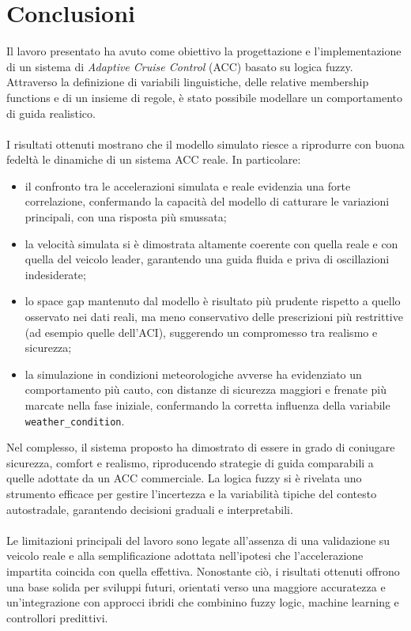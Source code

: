 \chapter{Conclusioni}
\label{cha:conclusioni}

\noindent Il lavoro presentato ha avuto come obiettivo la progettazione e l'implementazione 
di un sistema di \textit{Adaptive Cruise Control} (ACC) basato su logica fuzzy.  
Attraverso la definizione di variabili linguistiche, delle relative membership functions 
e di un insieme di regole, è stato possibile modellare un comportamento 
di guida realistico.
\\\\
\noindent I risultati ottenuti mostrano che il modello simulato riesce a riprodurre con buona 
fedeltà le dinamiche di un sistema ACC reale.  
In particolare:
\begin{itemize}
    \item il confronto tra le accelerazioni simulata e reale evidenzia una forte correlazione, 
    confermando la capacità del modello di catturare le variazioni principali, con una risposta più smussata;
    \item la velocità simulata si è dimostrata altamente coerente con quella reale e con quella del veicolo leader, 
    garantendo una guida fluida e priva di oscillazioni indesiderate;
    \item lo space gap mantenuto dal modello è risultato più prudente rispetto a quello osservato nei dati reali, 
    ma meno conservativo delle prescrizioni più restrittive (ad esempio quelle dell'ACI), 
    suggerendo un compromesso tra realismo e sicurezza;
    \item la simulazione in condizioni meteorologiche avverse ha evidenziato un comportamento più cauto, 
    con distanze di sicurezza maggiori e frenate più marcate nella fase iniziale, confermando 
    la corretta influenza della variabile \texttt{weather\_condition}.
\end{itemize}

\noindent Nel complesso, il sistema proposto ha dimostrato di essere in grado di coniugare sicurezza, comfort e realismo, 
riproducendo strategie di guida comparabili a quelle adottate da un ACC commerciale.  
La logica fuzzy si è rivelata uno strumento efficace per gestire l'incertezza e la variabilità tipiche del contesto autostradale, 
garantendo decisioni graduali e interpretabili.
\\\\
\noindent Le limitazioni principali del lavoro sono legate all'assenza di una validazione su veicolo reale 
e alla semplificazione adottata nell'ipotesi che l'accelerazione impartita coincida con quella effettiva.  
Nonostante ciò, i risultati ottenuti offrono una base solida per sviluppi futuri, 
orientati verso una maggiore accuratezza e un'integrazione con approcci ibridi che combinino fuzzy logic, 
machine learning e controllori predittivi.


